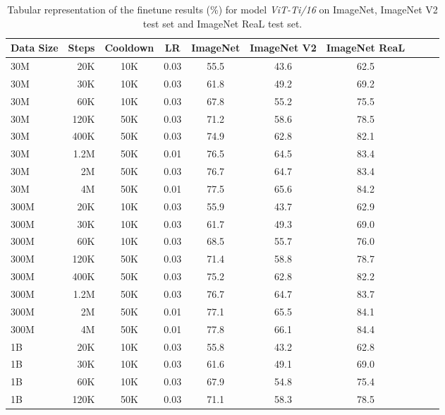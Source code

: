 \begin{table}[h]
  \setlength{\tabcolsep}{5pt}
  \setlength{\extrarowheight}{5pt}
  \renewcommand{\arraystretch}{0.75}
  \centering
  \caption{Tabular representation of the finetune results (\%) for model \emph{ViT-Ti/16} on ImageNet, ImageNet V2 test set and ImageNet ReaL test set.}\label{tbl:ti_16_ft}
  \begin{tabulary}{1.0\textwidth}{l r c c c c c c c c}
    \toprule[1pt]
    \bf{Data Size} & \bf{Steps} & \bf{Cooldown} & \bf{LR} & \bf{ImageNet} & \bf{ImageNet V2} & \bf{ImageNet ReaL} \\
    \midrule
30M   & 20K   & 10K   & 0.03 & 55.5 & 43.6 & 62.5 \\
30M   & 30K   & 10K   & 0.03 & 61.8 & 49.2 & 69.2 \\
30M   & 60K   & 10K   & 0.03 & 67.8 & 55.2 & 75.5 \\
30M   & 120K  & 50K   & 0.03 & 71.2 & 58.6 & 78.5 \\
30M   & 400K  & 50K   & 0.03 & 74.9 & 62.8 & 82.1 \\
30M   & 1.2M  & 50K   & 0.01 & 76.5 & 64.5 & 83.4 \\
30M   & 2M    & 50K   & 0.03 & 76.7 & 64.7 & 83.4 \\
30M   & 4M    & 50K   & 0.01 & 77.5 & 65.6 & 84.2 \\
\midrule[0.25pt]
300M  & 20K   & 10K   & 0.03 & 55.9 & 43.7 & 62.9 \\
300M  & 30K   & 10K   & 0.03 & 61.7 & 49.3 & 69.0 \\
300M  & 60K   & 10K   & 0.03 & 68.5 & 55.7 & 76.0 \\
300M  & 120K  & 50K   & 0.03 & 71.4 & 58.8 & 78.7 \\
300M  & 400K  & 50K   & 0.03 & 75.2 & 62.8 & 82.2 \\
300M  & 1.2M  & 50K   & 0.03 & 76.7 & 64.7 & 83.7 \\
300M  & 2M    & 50K   & 0.01 & 77.1 & 65.5 & 84.1 \\
300M  & 4M    & 50K   & 0.01 & 77.8 & 66.1 & 84.4 \\
\midrule[0.25pt]
1B    & 20K   & 10K   & 0.03 & 55.8 & 43.2 & 62.8 \\
1B    & 30K   & 10K   & 0.03 & 61.6 & 49.1 & 69.0 \\
1B    & 60K   & 10K   & 0.03 & 67.9 & 54.8 & 75.4 \\
1B    & 120K  & 50K   & 0.03 & 71.1 & 58.3 & 78.5 \\

\end{tabulary}
\end{table}
